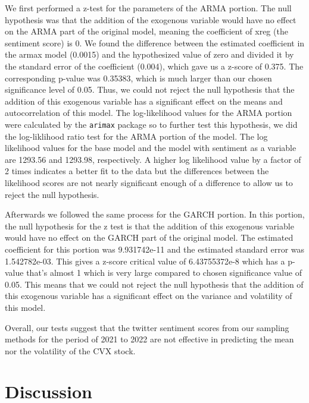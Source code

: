 \documentclass[12pt, letterpaper, titlepage]{article}
\begin{document}
We first performed a z-test for the parameters of the ARMA portion. The null hypothesis was that the addition of the exogenous variable would have no effect on the ARMA part of the original model, meaning the coefficient of xreg (the sentiment score) is 0. We found the difference between the estimated coefficient in the armax model (0.0015) and the hypothesized value of zero and divided it by the standard error of the coefficient (0.004), which gave us a z-score of 0.375. The corresponding p-value was 0.35383, which is much larger than our chosen significance level of 0.05. Thus, we could not reject the null hypothesis that the addition of this exogenous variable has a significant effect on the means and autocorrelation of this model.  The log-likelihood values for the ARMA portion were calculated by the \texttt{arimax} package so to further test this hypothesis, we did the log-liklihood ratio test for the ARMA portion of the model. The log likelihood values for the base model and the model with sentiment as a variable are 1293.56 and 1293.98, respectively. A higher log likelihood value by a factor of 2 times indicates a better fit to the data but the differences between the likelihood scores are not nearly significant enough of a difference to allow us to reject the null hypothesis.

Afterwards we followed the same process for the GARCH portion. In this portion, the null hypothesis for the z test is that the addition of this exogenous variable would have no effect on the GARCH part of the original model. The estimated coefficient for this portion was 9.931742e-11  and the estimated standard error was 1.542782e-03. This gives a z-score critical value of 6.43755372e-8 which has a p-value that's almost 1 which is very large compared to chosen significance value of 0.05. This means that we could not reject the null hypothesis that the addition of this exogenous variable has a significant effect on the variance and volatility of this model. 

Overall, our tests suggest that the twitter sentiment scores from our sampling methods for the period of 2021 to 2022 are not effective in predicting the mean nor the volatility of the CVX stock.

\section{Discussion}
\label{sec:discussion}
\end{document}
